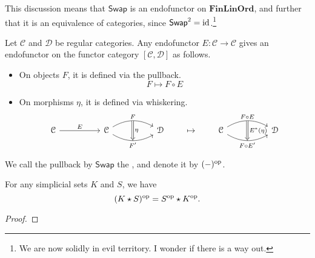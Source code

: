 \documentclass[main.tex]{subfiles}
\begin{document}
This discussion means that $\mathsf{Swap}$ is an endofunctor on $\mathbf{FinLinOrd}$, and further that it is an equivalence of categories, since $\mathsf{Swap}^{2} = \mathrm{id}$.\footnote{We are now solidly in evil territory. I wonder if there is a way out.}

Let $\mathcal{C}$ and $\mathcal{D}$ be regular categories. Any endofunctor $E\colon \mathcal{C} \to \mathcal{C}$ gives an endofunctor on the functor category $[\mathcal{C}, \mathcal{D}]$ as follows.
\begin{itemize}
  \item On objects $F$, it is defined via the pullback.
    \begin{equation*}
      F \mapsto F \circ E
    \end{equation*}

  \item On morphisms $\eta$, it is defined via whiskering.
    \begin{equation*}
      \begin{tikzcd}[column sep=huge]
        \mathcal{C}
        \arrow[r, "E"]
        &\mathcal{C}
        \arrow[r, bend left, "F"{name=U}]
        \arrow[r, bend right, swap, "F'"{name=D}]
        & \mathcal{D}
        \arrow[from=U, to=D, Rightarrow, "\eta"]
      \end{tikzcd}
      \qquad
      \mapsto
      \qquad
      \begin{tikzcd}[column sep=huge]
        \mathcal{C}
        \arrow[r, bend left, "F \circ E"{name=U}]
        \arrow[r, bend right, swap, "F \circ E'"{name=D}]
        & \mathcal{D}
        \arrow[from=U, to=D, Rightarrow, "E^{*}(\eta)"]
      \end{tikzcd}
    \end{equation*}

\end{itemize}
\begin{definition}
  \label{def:opposite_functor}
  We call the pullback by $\mathsf{Swap}$ the , and denote it by $(-)^{\mathrm{op}}$.
\end{definition}

\begin{theorem}
  For any simplicial sets $K$ and $S$, we have
  \begin{equation*}
    (K \star S)^{\mathrm{op}} = S^{\mathrm{op}} \star K^{\mathrm{op}}.
  \end{equation*}
\end{theorem}
\begin{proof}

\end{proof}
\end{document}

